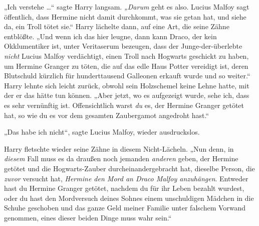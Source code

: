 „Ich verstehe …“ sagte Harry langsam. \emph{„Darum} geht es also. Lucius Malfoy sagt öffentlich, dass Hermine nicht damit durchkommt, was sie getan hat, und siehe da, ein Troll tötet sie.“ Harry lächelte dann, auf eine Art, die seine Zähne entblößte.
„Und wenn ich das hier leugne, dann kann Draco, der kein Okklumentiker ist, unter Veritaserum bezeugen, dass der Junge-der-überlebte \emph{nicht} Lucius Malfoy verdächtigt, einen Troll nach Hogwarts geschickt zu haben, um Hermine Granger zu töten, die auf das edle Haus Potter vereidigt ist, deren Blutschuld kürzlich für hunderttausend Galleonen erkauft wurde und so weiter.“
Harry lehnte sich leicht zurück, obwohl sein Holzschemel keine Lehne hatte, mit der er das hätte tun können.
„Aber jetzt, wo es aufgezeigt wurde, sehe ich, dass es sehr vernünftig ist. Offensichtlich warst \emph{du} es, der Hermine Granger getötet hat, so wie du es vor dem gesamten Zaubergamot angedroht hast.“

„Das habe ich nicht“, sagte Lucius Malfoy, wieder ausdruckslos.

Harry fletschte wieder seine Zähne in diesem Nicht-Lächeln.
„Nun denn, in \emph{diesem} Fall muss es da draußen noch jemanden \emph{anderen} geben, der Hermine getötet und die Hogwarts-Zauber durcheinandergebracht hat, dieselbe Person, die \emph{zuvor} versucht hat, \emph{Hermine den Mord an Draco Malfoy anzuhängen}. Entweder hast du Hermine Granger getötet, nachdem du für ihr Leben bezahlt wurdest, oder du hast den Mordversuch deines Sohnes einem unschuldigen Mädchen in die Schuhe geschoben und das ganze Geld meiner Familie unter falschem Vorwand genommen, eines dieser beiden Dinge muss wahr sein.“

